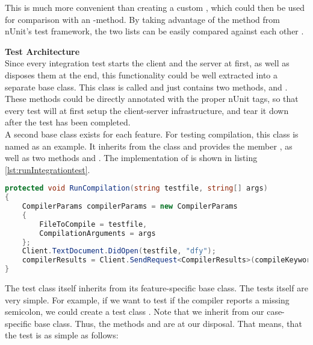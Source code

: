 This is much more convenient than creating a custom , which could then be used for comparison with an -method.
By taking advantage of the method  from nUnit's test framework,
the two lists can be easily compared against each other \cite{nunitCollectionAssert}.

\textbf{Test Architecture}\\
Since every integration test starts the client and the server at first, as well as disposes them at the end,
this functionality could be well extracted into a separate base class.
This class is called  and just contains two methods,  and .
These methods could be directly annotated with the proper nUnit tags,
so that every test will at first setup the client-server infrastructure,
and tear it down after the test has been completed.\\

A second base class exists for each feature.
For testing compilation, this class is named  as an example.
It inherits from the  class and provides the member ,
as well as two methods  and .
The implementation of  is shown in listing \ref{lst:runIntegrationtest}.\\

\begin{lstlisting}[language=csharp, caption={Running a Compilation Integration test}, captionpos=b, label={lst:runIntegrationtest}]
protected void RunCompilation(string testfile, string[] args)
{
    CompilerParams compilerParams = new CompilerParams
    {
        FileToCompile = testfile,
        CompilationArguments = args
    };
    Client.TextDocument.DidOpen(testfile, "dfy");
    compilerResults = Client.SendRequest<CompilerResults>(compileKeyword, compilerParams, CancellationSource.Token).Result;
}
\end{lstlisting}

The test class itself inherits from its feature-specific base class.
The tests itself are very simple.
For example, if we want to test if the compiler reports a missing semicolon, we could create a test class .
Note that we inherit from our case-specific base class.
Thus, the methods  and are at our disposal.
That means, that the test is as simple as follows:

